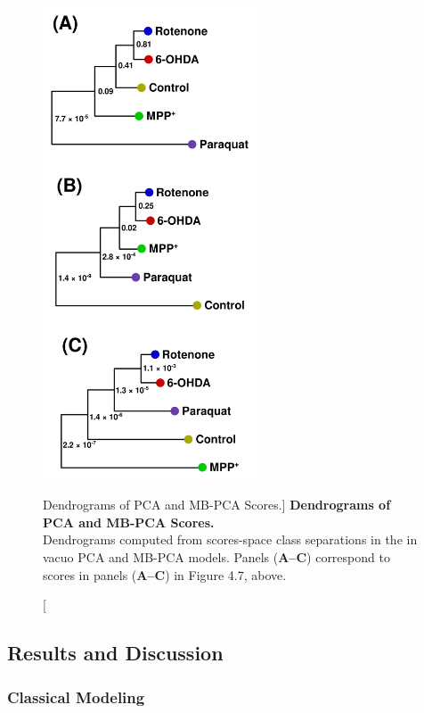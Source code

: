 \begin{figure}
\includegraphics[width=2.5in]{figs/apps/08-mbpca-d.png}
\caption
      [Dendrograms of PCA and MB-PCA Scores.]{
  {\bf Dendrograms of PCA and MB-PCA Scores.}
  \\
  Dendrograms computed from scores-space class separations
  \cite{worley:abio2013} in the in vacuo PCA and MB-PCA models. Panels
  ({\bf A--C}) correspond to scores in panels ({\bf A--C}) in Figure 4.7,
  above.
}
\end{figure}

\subsection{Results and Discussion}

\subsubsection{Classical Modeling}

